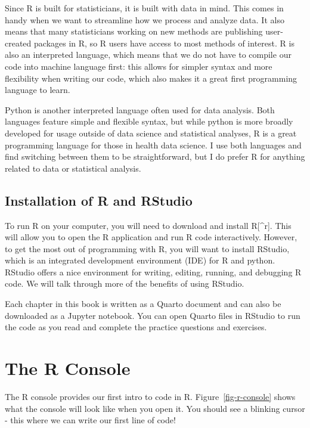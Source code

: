 \documentclass[
  letterpaper,
]{krantz}
\begin{document}
Since R is built for statisticians, it is built with data in mind. This
comes in handy when we want to streamline how we process and analyze
data. It also means that many statisticians working on new methods are
publishing user-created packages in R, so R users have access to most
methods of interest. R is also an interpreted language, which means that
we do not have to compile our code into machine language first: this
allows for simpler syntax and more flexibility when writing our code,
which also makes it a great first programming language to learn.

Python is another interpreted language often used for data analysis.
Both languages feature simple and flexible syntax, but while python is
more broadly developed for usage outside of data science and statistical
analyses, R is a great programming language for those in health data
science. I use both languages and find switching between them to be
straightforward, but I do prefer R for anything related to data or
statistical analysis.

\hypertarget{installation-of-r-and-rstudio}{%
\subsection{Installation of R and
RStudio}\label{installation-of-r-and-rstudio}}

To run R on your computer, you will need to download and install
R{[}\^{}r{]}. This will allow you to open the R application and run R
code interactively. However, to get the most out of programming with R,
you will want to install RStudio, which is an integrated development
environment (IDE) for R and python. RStudio offers a nice environment
for writing, editing, running, and debugging R code. We will talk
through more of the benefits of using RStudio.

Each chapter in this book is written as a Quarto document and can also
be downloaded as a Jupyter notebook. You can open Quarto files in
RStudio to run the code as you read and complete the practice questions
and exercises.

\hypertarget{the-r-console}{%
\section{The R Console}\label{the-r-console}}

The R console provides our first intro to code in R.
Figure~\ref{fig-r-console} shows what the console will look like when
you open it. You should see a blinking cursor - this where we can write
our first line of code!
\end{document}

